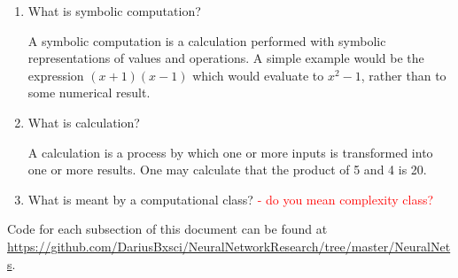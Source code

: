 \documentclass[./Research.tex]{subfiles}
\begin{document}
    \begin{enumerate}
        \item What is symbolic computation?
        
        A symbolic computation is a calculation performed with symbolic representations of values and operations. A simple example would be the expression $(x + 1)(x - 1)$ which would evaluate to $x^2 - 1$, rather than to some numerical result.

        \item What is calculation?
        
        A calculation is a process by which one or more inputs is transformed into one or more results. One may calculate that the product of 5 and 4 is 20.
        
        \item What is meant by a computational class? \textcolor{red}{- do you mean complexity class?}
        
    \end{enumerate}
    
     Code for each subsection of this document can be found at \url{https://github.com/DariusBxsci/NeuralNetworkResearch/tree/master/NeuralNets}. 
\end{document}
